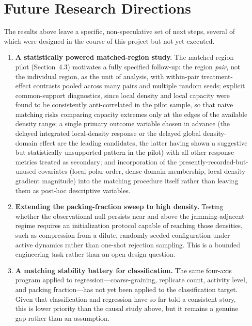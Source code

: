 \documentclass[11pt]{article}
\begin{document}
\section{Future Research Directions}

The results above leave a specific, non-speculative set of next steps, several of which were designed in the course of this project but not yet executed.

\begin{enumerate}
\item \textbf{A statistically powered matched-region study.} The matched-region pilot (Section~4.3) motivates a fully specified follow-up: the region \emph{pair}, not the individual region, as the unit of analysis, with within-pair treatment-effect contrasts pooled across many pairs and multiple random seeds; explicit common-support diagnostics, since local density and local capacity were found to be consistently anti-correlated in the pilot sample, so that naive matching risks comparing capacity extremes only at the edges of the available density range; a single primary outcome variable chosen in advance (the delayed integrated local-density response or the delayed global density-domain effect are the leading candidates, the latter having shown a suggestive but statistically unsupported pattern in the pilot) with all other response metrics treated as secondary; and incorporation of the presently-recorded-but-unused covariates (local polar order, dense-domain membership, local density-gradient magnitude) into the matching procedure itself rather than leaving them as post-hoc descriptive variables.

\item \textbf{Extending the packing-fraction sweep to high density.} Testing whether the observational null persists near and above the jamming-adjacent regime requires an initialization protocol capable of reaching those densities, such as compression from a dilute, randomly-seeded configuration under active dynamics rather than one-shot rejection sampling. This is a bounded engineering task rather than an open design question.

\item \textbf{A matching stability battery for classification.} The same four-axis program applied to regression---coarse-graining, replicate count, activity level, and packing fraction---has not yet been applied to the classification target. Given that classification and regression have so far told a consistent story, this is lower priority than the causal study above, but it remains a genuine gap rather than an assumption.


\end{enumerate}
\end{document}
